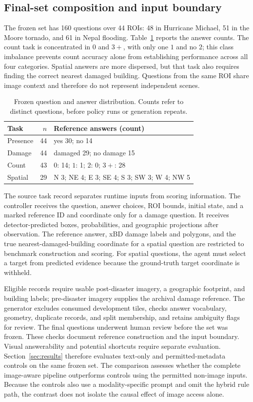 \subsection{Final-set composition and input boundary}
The frozen set has 160 questions over 44 ROIs: 48 in Hurricane Michael, 51 in the Moore tornado, and 61 in Nepal flooding. Table~\ref{tab:answer-distribution} reports the answer counts. The count task is concentrated in $0$ and $3+$, with only one $1$ and no $2$; this class imbalance prevents count accuracy alone from establishing performance across all four categories. Spatial answers are more dispersed, but that task also requires finding the correct nearest damaged building. Questions from the same ROI share image context and therefore do not represent independent scenes.

\begin{table}[htbp]
\centering\small
\caption{Frozen question and answer distribution. Counts refer to distinct questions, before policy runs or generation repeats.}
\label{tab:answer-distribution}
\begin{tabularx}{\linewidth}{@{}l r X@{}}
\toprule
Task & $n$ & Reference answers (count)\\
\midrule
Presence & 44 & yes 30; no 14\\
Damage & 44 & damaged 29; no damage 15\\
Count & 43 & $0$: 14; $1$: 1; $2$: 0; $3+$: 28\\
Spatial & 29 & N 3; NE 4; E 3; SE 4; S 3; SW 3; W 4; NW 5\\
\bottomrule
\end{tabularx}
\end{table}

The source task record separates runtime inputs from scoring information. The controller receives the question, answer choices, ROI bounds, initial state, and a marked reference ID and coordinate only for a damage question. It receives detector-predicted boxes, probabilities, and geographic projections after observation. The reference answer, xBD damage labels and polygons, and the true nearest-damaged-building coordinate for a spatial question are restricted to benchmark construction and scoring. For spatial questions, the agent must select a target from predicted evidence because the ground-truth target coordinate is withheld.

Eligible records require usable post-disaster imagery, a geographic footprint, and building labels; pre-disaster imagery supplies the archival damage reference. The generator excludes consumed development tiles, checks answer vocabulary, geometry, duplicate records, and split membership, and retains ambiguity flags for review. The final questions underwent human review before the set was frozen. These checks document reference construction and the input boundary. Visual answerability and potential shortcuts require separate evaluation. Section~\ref{sec:results} therefore evaluates text-only and permitted-metadata controls on the same frozen set. The comparison assesses whether the complete image-aware pipeline outperforms controls using the permitted non-image inputs. Because the controls also use a modality-specific prompt and omit the hybrid rule path, the contrast does not isolate the causal effect of image access alone.
